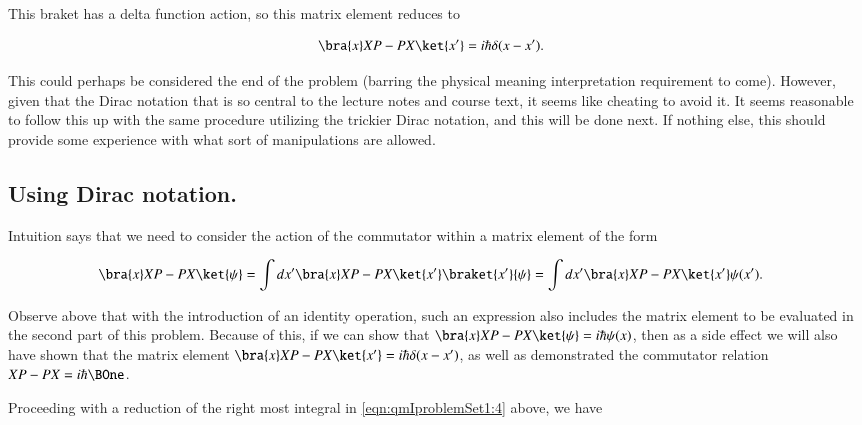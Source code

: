 This braket has a delta function action, so this matrix element reduces to

\begin{align}\label{eqn:qmIproblemSet1:2}
\bra{x} XP - PX \ket{x'}
&=
i \hbar \delta(x - x').
\end{align}

This could perhaps be considered the end of the problem (barring the physical meaning interpretation requirement to come).  However, given that the Dirac notation that is so central to the lecture notes and course text, it seems like cheating to avoid it.  It seems reasonable to follow this up with the same procedure utilizing the trickier Dirac notation, and this will be done next.  If nothing else, this should provide some experience with what sort of manipulations are allowed.

\subsection{Using Dirac notation.}

Intuition says that we need to consider the action of the commutator within a matrix element of the form

\begin{align}\label{eqn:qmIproblemSet1:4}
\bra{x} XP - PX \ket{\psi} &= \int dx' \bra{x} XP - PX \ket{x'} \braket{x'}{\psi} = \int dx' \bra{x} XP - PX \ket{x'} \psi(x').
\end{align}

Observe above that with the introduction of an identity operation, such an expression also includes the matrix element to be evaluated in the second part of this problem.  Because of this, if we can show that $\bra{x} XP - PX \ket{\psi} = i\hbar \psi(x)$, then as a side effect we will also have shown that the matrix element $\bra{x} XP - PX \ket{x'} = i\hbar\delta(x-x')$, as well as demonstrated the commutator relation $XP - PX = i\hbar \BOne$.

Proceeding with a reduction of the right most integral in \ref{eqn:qmIproblemSet1:4} above, we have

